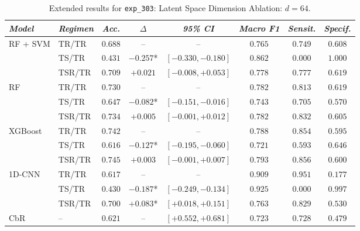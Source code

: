 \begin{table}[H]
\centering
\scriptsize
\caption{Extended results for \texttt{exp\_303}: Latent Space Dimension Ablation: $d=64$.}
\label{tab:appendix_exp_303}
\begin{tabular*}{\textwidth}{@{\extracolsep{\fill}}llcccccc}
\toprule
\emph{Model} & \emph{Regimen} & \emph{Acc.} & \emph{$\Delta$} & \emph{95\% CI} & \emph{Macro F1} & \emph{Sensit.} & \emph{Specif.}\\
\midrule
\multirow{3}{*}{RF + SVM} & TR/TR & $0.688$ & -- & -- & $0.765$ & $0.749$ & $0.608$\\
 & TS/TR & $0.431$ & $-0.257$* & $[-0.330, -0.180]$ & $0.862$ & $0.000$ & $1.000$\\
 & TSR/TR & $0.709$ & $+0.021$ & $[-0.008, +0.053]$ & $0.778$ & $0.777$ & $0.619$\\
\midrule
\multirow{3}{*}{RF} & TR/TR & $0.730$ & -- & -- & $0.782$ & $0.813$ & $0.619$\\
 & TS/TR & $0.647$ & $-0.082$* & $[-0.151, -0.016]$ & $0.743$ & $0.705$ & $0.570$\\
 & TSR/TR & $0.734$ & $+0.005$ & $[-0.001, +0.012]$ & $0.782$ & $0.832$ & $0.605$\\
\midrule
\multirow{3}{*}{XGBoost} & TR/TR & $0.742$ & -- & -- & $0.788$ & $0.854$ & $0.595$\\
 & TS/TR & $0.616$ & $-0.127$* & $[-0.195, -0.060]$ & $0.721$ & $0.593$ & $0.646$\\
 & TSR/TR & $0.745$ & $+0.003$ & $[-0.001, +0.007]$ & $0.793$ & $0.856$ & $0.600$\\
\midrule
\multirow{3}{*}{1D-CNN} & TR/TR & $0.617$ & -- & -- & $0.909$ & $0.951$ & $0.177$\\
 & TS/TR & $0.430$ & $-0.187$* & $[-0.249, -0.134]$ & $0.925$ & $0.000$ & $0.997$\\
 & TSR/TR & $0.700$ & $+0.083$* & $[+0.018, +0.151]$ & $0.763$ & $0.829$ & $0.530$\\
\midrule
CbR & -- & $0.621$ & -- & $[+0.552, +0.681]$ & $0.723$ & $0.728$ & $0.479$\\
\bottomrule
\end{tabular*}
\end{table}

